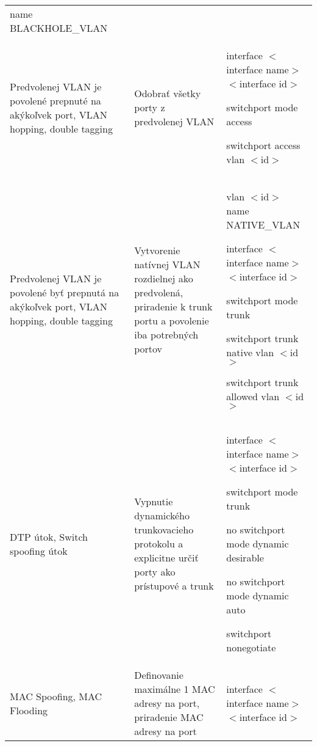 \begin{longtable}[!htbp]{|L{10em}L{10em}>{\selectfont}L{34em}|}
	\hspace{0.5em}name BLACKHOLE\_VLAN\\
	
	
	
	
	 Predvolenej VLAN je povolené prepnuté na akýkoľvek port, VLAN hopping, double tagging	&Odobrať všetky porty z predvolenej VLAN	&interface $<$interface name$>$ $<$interface id$>$
	
	\hspace{0.5em} switchport mode access
	
	\hspace{0.5em} switchport access vlan $<$id$>$\\
	
	
	
	
	Predvolenej VLAN je povolené byť prepnutá na akýkoľvek port, VLAN hopping, double tagging	&Vytvorenie natívnej VLAN rozdielnej ako predvolená, priradenie k trunk portu a povolenie iba potrebných portov	&vlan $<$id$>$  
	name NATIVE\_VLAN
	
	interface $<$interface name$>$ $<$interface id$>$
	
	\hspace{0.5em}switchport mode trunk
	
	\hspace{0.5em}switchport trunk native vlan $<$id$>$
	
	\hspace{0.5em}switchport trunk allowed vlan $<$id$>$\\
	
	
	
	
	 DTP útok, Switch spoofing útok	&Vypnutie dynamického trunkovacieho protokolu a explicitne určiť porty ako prístupové a trunk	&
	interface $<$interface name$>$ $<$interface id$>$
	
	\hspace{0.5em}switchport mode trunk
	
	\hspace{0.5em}no switchport mode dynamic desirable
	
	\hspace{0.5em}no switchport mode dynamic auto
	
	\hspace{0.5em}switchport nonegotiate\\
	
	
	
	MAC Spoofing, MAC Flooding 	&Definovanie maximálne 1 MAC adresy na port, priradenie MAC adresy na port	&
	interface $<$interface name$>$ $<$interface id$>$
	

\end{longtable}
